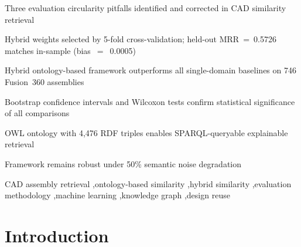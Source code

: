 \documentclass[preprint,12pt]{elsarticle}
\begin{document}
\begin{frontmatter}
\begin{graphicalabstract}
\end{graphicalabstract}

\begin{highlights}
\item Three evaluation circularity pitfalls identified and corrected in CAD similarity retrieval
\item Hybrid weights selected by 5-fold cross-validation; held-out MRR~=~0.5726 matches in-sample (bias~$=$~0.0005)
\item Hybrid ontology-based framework outperforms all single-domain baselines on 746 Fusion~360 assemblies
\item Bootstrap confidence intervals and Wilcoxon tests confirm statistical significance of all comparisons
\item OWL ontology with 4,476 RDF triples enables SPARQL-queryable explainable retrieval
\item Framework remains robust under 50\% semantic noise degradation
\end{highlights}

\begin{keyword}
CAD assembly retrieval \sep ontology-based similarity \sep hybrid similarity \sep evaluation methodology \sep machine learning \sep knowledge graph \sep design reuse
\end{keyword}

\end{frontmatter}

\linenumbers

\section{Introduction}
\end{document}

